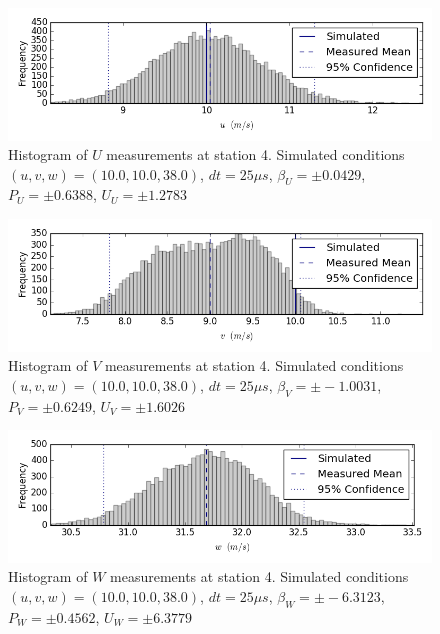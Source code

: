 \begin{figure}[H]
\centering
\includegraphics[width=6in]{figs/Ely_May28th04004/uncertainty_Ely_May28th04004_U}
\caption{Histogram of $U$ measurements at station 4. Simulated conditions $(u,v,w)=(10.0, 10.0, 38.0)$, $dt=25 \mu s$, $\beta_U=\pm 0.0429$, $P_U=\pm 0.6388$, $U_U=\pm 1.2783$}
\label{fig:uncertainty_Ely_May28th04004_U}
\end{figure}


\begin{figure}[H]
\centering
\includegraphics[width=6in]{figs/Ely_May28th04004/uncertainty_Ely_May28th04004_V}
\caption{Histogram of $V$ measurements at station 4. Simulated conditions $(u,v,w)=(10.0, 10.0, 38.0)$, $dt=25 \mu s$, $\beta_V=\pm -1.0031$, $P_V=\pm 0.6249$, $U_V=\pm 1.6026$}
\label{fig:uncertainty_Ely_May28th04004_V}
\end{figure}


\begin{figure}[H]
\centering
\includegraphics[width=6in]{figs/Ely_May28th04004/uncertainty_Ely_May28th04004_W}
\caption{Histogram of $W$ measurements at station 4. Simulated conditions $(u,v,w)=(10.0, 10.0, 38.0)$, $dt=25 \mu s$, $\beta_W=\pm -6.3123$, $P_W=\pm 0.4562$, $U_W=\pm 6.3779$}
\label{fig:uncertainty_Ely_May28th04004_W}
\end{figure}


